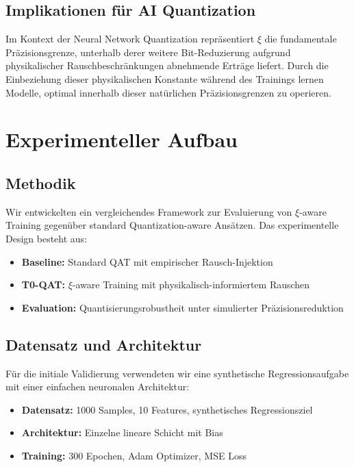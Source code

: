 	\subsection{Implikationen für AI Quantization}
	
	Im Kontext der Neural Network Quantization repräsentiert $\xi$ die fundamentale Präzisionsgrenze, unterhalb derer weitere Bit-Reduzierung aufgrund physikalischer Rauschbeschränkungen abnehmende Erträge liefert. Durch die Einbeziehung dieser physikalischen Konstante während des Trainings lernen Modelle, optimal innerhalb dieser natürlichen Präzisionsgrenzen zu operieren.
	
	\section{Experimenteller Aufbau}
	
	\subsection{Methodik}
	
	Wir entwickelten ein vergleichendes Framework zur Evaluierung von $\xi$-aware Training gegenüber standard Quantization-aware Ansätzen. Das experimentelle Design besteht aus:
	
	\begin{itemize}
		\item \textbf{Baseline:} Standard QAT mit empirischer Rausch-Injektion
		\item \textbf{T0-QAT:} $\xi$-aware Training mit physikalisch-informiertem Rauschen
		\item \textbf{Evaluation:} Quantisierungsrobustheit unter simulierter Präzisionsreduktion
	\end{itemize}
	
	\subsection{Datensatz und Architektur}
	
	Für die initiale Validierung verwendeten wir eine synthetische Regressionsaufgabe mit einer einfachen neuronalen Architektur:
	
	\begin{itemize}
		\item \textbf{Datensatz:} 1000 Samples, 10 Features, synthetisches Regressionsziel
		\item \textbf{Architektur:} Einzelne lineare Schicht mit Bias
		\item \textbf{Training:} 300 Epochen, Adam Optimizer, MSE Loss
	\end{itemize}
	

